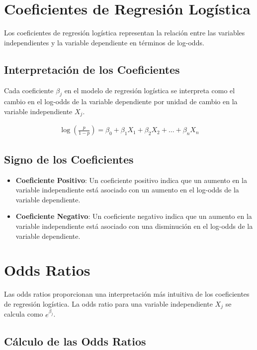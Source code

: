 \documentclass[a4paper]{report} %
\begin{document}
\section{Coeficientes de Regresi\'on Log\'istica}

Los coeficientes de regresi\'on log\'istica representan la relaci\'on entre las variables independientes y la variable dependiente en t\'erminos de log-odds. 

\subsection{Interpretaci\'on de los Coeficientes}

Cada coeficiente $\beta_j$ en el modelo de regresi\'on log\'istica se interpreta como el cambio en el log-odds de la variable dependiente por unidad de cambio en la variable independiente $X_j$.

\begin{eqnarray*}
\log\left(\frac{p}{1-p}\right) = \beta_0 + \beta_1 X_1 + \beta_2 X_2 + \ldots + \beta_n X_n
\end{eqnarray*}

\subsection{Signo de los Coeficientes}

\begin{itemize}
    \item \textbf{Coeficiente Positivo}: Un coeficiente positivo indica que un aumento en la variable independiente est\'a asociado con un aumento en el log-odds de la variable dependiente.
    \item \textbf{Coeficiente Negativo}: Un coeficiente negativo indica que un aumento en la variable independiente est\'a asociado con una disminuci\'on en el log-odds de la variable dependiente.
\end{itemize}

\section{Odds Ratios}

Las odds ratios proporcionan una interpretaci\'on m\'as intuitiva de los coeficientes de regresi\'on log\'istica. La odds ratio para una variable independiente $X_j$ se calcula como $e^{\beta_j}$.

\subsection{C\'alculo de las Odds Ratios}
\end{document}
